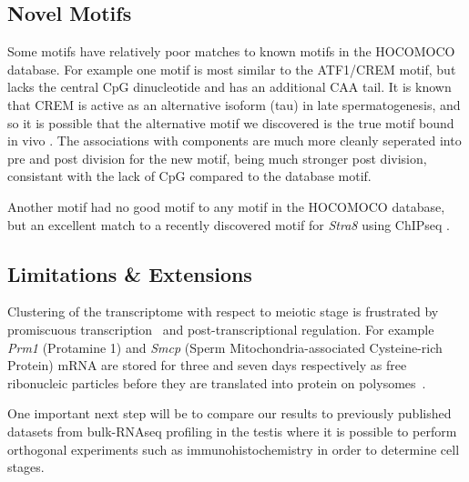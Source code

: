   
\subsection{Novel Motifs}

Some motifs have relatively poor matches to known motifs in the HOCOMOCO database. For example one motif is most similar to the ATF1/CREM motif, but lacks the central CpG dinucleotide and has an additional CAA tail. It is known that CREM is active as an alternative isoform (tau) in late spermatogenesis, and so it is possible that the alternative motif we discovered is the true motif bound in vivo \parencite{Sassone-Corsi2000CREM}. The associations with components are much more cleanly seperated into pre and post division for the new motif, being much stronger post division, consistant with the lack of CpG compared to the database motif.

Another motif had no good motif to any motif in the HOCOMOCO database, but an excellent match to a recently discovered motif for \textit{Stra8} using ChIPseq \parencite{Kojima2019Amplification}.




\subsection{Limitations \& Extensions}
Clustering of the transcriptome with respect to meiotic stage is frustrated by promiscuous transcription~\cite{Soumillon2013Cellular} and post-transcriptional regulation. For example \textit{Prm1} (Protamine 1) and \textit{Smcp} (Sperm Mitochondria-associated Cysteine-rich Protein) mRNA are stored for three and seven days respectively as free ribonucleic particles before they are translated into protein on polysomes~\cite{Cullinane2015Mechanisms, Kleene1984Translational, Kleene2004Patterns}.



One important next step will be to compare our results to previously published datasets from bulk-RNAseq profiling in the testis where it is possible to perform orthogonal experiments such as immunohistochemistry in order to determine cell stages.

